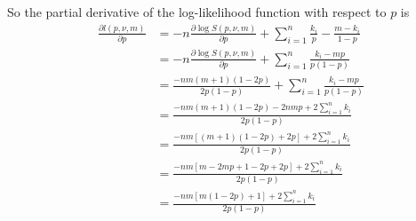 \documentclass[a4paper,12pt]{article}
\theoremstyle{definition}
\newcommand{\pdiff}[2]{\frac{\partial #1}{\partial #2}} %
\begin{document}
So the partial derivative of the log-likelihood function with respect to $p$ is
\begin{align}
  \pdiff{l(p,\nu,m)}{p} & = -n \pdiff{\log S(p, \nu, m)}{p} + \sum_{i=1}^n \frac{k_i}{p} - \frac{m-k_i}{1-p} \\
  & = -n \pdiff{\log S(p, \nu, m)}{p} + \sum_{i=1}^n \frac{k_i - mp}{p(1-p)} \\
  & = \frac{-nm(m+1)(1-2p)}{2p(1-p)} + \sum_{i=1}^n \frac{k_i - mp}{p(1-p)} \\
  & = \frac{-nm(m+1)(1-2p) - 2nmp + 2\sum_{i=1}^n k_i}{2p(1-p)} \\
  & = \frac{-nm\left[ (m+1)(1-2p) + 2p \right] + 2\sum_{i=1}^n k_i}{2p(1-p)} \\
  & = \frac{-nm \left[m - 2mp + 1 -2p +2p \right] + 2 \sum_{i=1}^n k_i}{2p(1-p)} \\
  & = \frac{-nm\left[ m(1-2p) + 1\right] + 2 \sum_{i=1}^n k_i}{2p(1-p)}
\end{align}

\newpage

\end{document}
